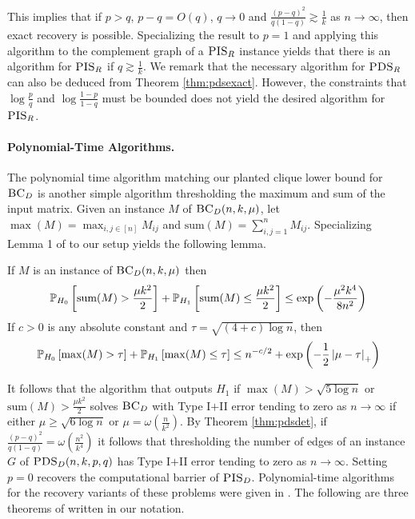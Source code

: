This implies that if $p > q$, $p - q = O(q)$, $q \to 0$ and $\frac{(p - q)^2}{q(1 - q)} \gtrsim \frac{1}{k}$ as $n \to \infty$, then exact recovery is possible. Specializing the result to $p = 1$ and applying this algorithm to the complement graph of a $\textsc{PIS}_R$ instance yields that there is an algorithm for $\textsc{PIS}_R$ if $q \gtrsim \frac{1}{k}$. We remark that the necessary algorithm for $\textsc{PDS}_R$ can also be deduced from Theorem \ref{thm:pdsexact}. However, the constraints that $\log \frac{p}{q}$ and $\log \frac{1 - p}{1 - q}$ must be bounded does not yield the desired algorithm for $\textsc{PIS}_R$.

\paragraph{Polynomial-Time Algorithms.} The polynomial time algorithm matching our planted clique lower bound for $\textsc{BC}_D$ is another simple algorithm thresholding the maximum and sum of the input matrix. Given an instance $M$ of $\textsc{BC}_D(n, k, \mu)$, let $\max(M) = \max_{i, j \in [n]} M_{ij}$ and $\text{sum}(M) =  \sum_{i, j = 1}^n M_{ij}$. Specializing Lemma 1 of \cite{ma2015computational} to our setup yields the following lemma.

\begin{lemma}
If $M$ is an instance of $\textsc{BC}_D(n, k, \mu)$ then
$$\mathbb{P}_{H_0} \left[ \textnormal{sum}(M) > \frac{\mu k^2}{2} \right] + \mathbb{P}_{H_1} \left[ \textnormal{sum}(M) \le \frac{\mu k^2}{2} \right] \le \exp \left( - \frac{\mu^2 k^4}{8n^2} \right)$$
If $c > 0$ is any absolute constant and $\tau = \sqrt{(4 + c) \log n}$, then
$$\mathbb{P}_{H_0} \left[ \max(M) > \tau \right] + \mathbb{P}_{H_1} \left[ \max(M) \le \tau \right] \le n^{-c/2} + \exp \left( - \frac{1}{2} \left| \mu - \tau \right|_+ \right)$$
\end{lemma}

It follows that the algorithm that outputs $H_1$ if $\max(M) > \sqrt{5 \log n}$ or $\text{sum}(M) > \frac{\mu k^2}{2}$ solves $\textsc{BC}_D$ with Type I$+$II error tending to zero as $n \to \infty$ if either $\mu \ge \sqrt{6 \log n}$ or $\mu = \omega\left(\frac{n}{k^2}\right)$. By Theorem \ref{thm:pdsdet}, if $\frac{(p - q)^2}{q(1 - q)} = \omega\left( \frac{n^2}{k^4} \right)$ it follows that thresholding the number of edges of an instance $G$ of $\textsc{PDS}_D(n, k, p, q)$ has Type I$+$II error tending to zero as $n \to \infty$. Setting $p = 0$ recovers the computational barrier of $\textsc{PIS}_D$. Polynomial-time algorithms for the recovery variants of these problems were given in \cite{chen2016statistical}. The following are three theorems of \cite{chen2016statistical} written in our notation.

